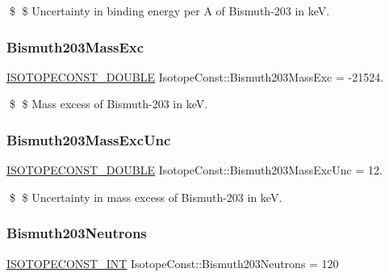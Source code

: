 \$ \$ Uncertainty in binding energy per A of Bismuth-\/203 in keV. \mbox{\label{group___isotope_const-_bismuth-_bi203_ga11bcc02838b1a3f4211ad0ad01caa61e}} 
\subsubsection{\texorpdfstring{Bismuth203\+Mass\+Exc}{Bismuth203MassExc}}
{\footnotesize\ttfamily \mbox{\hyperlink{group___isotope_const-_macros_ga8f45a7272ce02c0b4c65c44636ed719a}{I\+S\+O\+T\+O\+P\+E\+C\+O\+N\+S\+T\+\_\+\+D\+O\+U\+B\+LE}} Isotope\+Const\+::\+Bismuth203\+Mass\+Exc = -\/21524.}

\$ \$ Mass excess of Bismuth-\/203 in keV. \mbox{\label{group___isotope_const-_bismuth-_bi203_ga5811a1cc4444c0cdc7d4e6dc6522ed11}} 
\subsubsection{\texorpdfstring{Bismuth203\+Mass\+Exc\+Unc}{Bismuth203MassExcUnc}}
{\footnotesize\ttfamily \mbox{\hyperlink{group___isotope_const-_macros_ga8f45a7272ce02c0b4c65c44636ed719a}{I\+S\+O\+T\+O\+P\+E\+C\+O\+N\+S\+T\+\_\+\+D\+O\+U\+B\+LE}} Isotope\+Const\+::\+Bismuth203\+Mass\+Exc\+Unc = 12.}

\$ \$ Uncertainty in mass excess of Bismuth-\/203 in keV. \mbox{\label{group___isotope_const-_bismuth-_bi203_ga33b848f0c4f55474ddce16cad1401cdc}} 
\subsubsection{\texorpdfstring{Bismuth203\+Neutrons}{Bismuth203Neutrons}}
{\footnotesize\ttfamily \mbox{\hyperlink{group___isotope_const-_macros_ga5f18360b3e99483a35c32d789e62621c}{I\+S\+O\+T\+O\+P\+E\+C\+O\+N\+S\+T\+\_\+\+I\+NT}} Isotope\+Const\+::\+Bismuth203\+Neutrons = 120}


